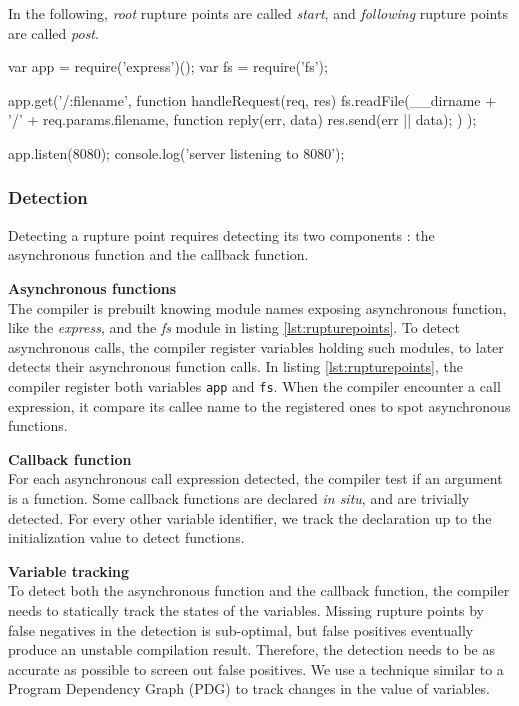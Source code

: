 In the following, \textit{root} rupture points are called \textit{start}, and \textit{following} rupture points are called \textit{post}.

\begin{code}[Javascript, caption={Example of an application presenting the two types of rupture points : a \texttt{start} with the call to \texttt{app.get()}, and a \texttt{post} with the call to \texttt{fs.readFile()}},label={lst:rupturepoints}]
var app = require('express')();
var fs = require('fs');

app.get('/:filename', function handleRequest(req, res) {
  fs.readFile(__dirname + '/' + req.params.filename, function reply(err, data) {
    res.send(err || data);
  })
});

app.listen(8080);
console.log('server listening to 8080');
\end{code}

\subsubsection{Detection}

Detecting a rupture point requires detecting its two components : the asynchronous function and the callback function.

\textbf{Asynchronous functions}\\
The compiler is prebuilt knowing module names exposing asynchronous function, like the \textit{express}, and the \textit{fs} module in listing \ref{lst:rupturepoints}.
To detect asynchronous calls, the compiler register variables holding such modules, to later detects their asynchronous function calls.
In listing \ref{lst:rupturepoints}, the compiler register both variables \texttt{app} and \texttt{fs}.
When the compiler encounter a call expression, it compare its callee name to the registered ones to spot asynchronous functions.

\textbf{Callback function}\\
For each asynchronous call expression detected, the compiler test if an argument is a function.
Some callback functions are declared \textit{in situ}, and are trivially detected.
For every other variable identifier, we track the declaration up to the initialization value to detect functions.

\textbf{Variable tracking}\\
To detect both the asynchronous function and the callback function, the compiler needs to statically track the states of the variables.
Missing rupture points by false negatives in the detection is sub-optimal, but false positives eventually produce an unstable compilation result.
Therefore, the detection needs to be as accurate as possible to screen out false positives.
We use a technique similar to a Program Dependency Graph (PDG)\cite{Ferrante1987} to track changes in the value of variables.


